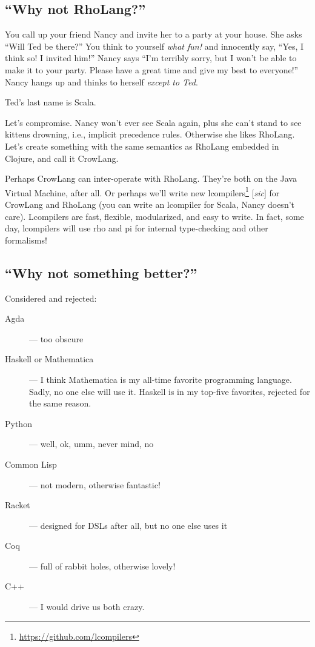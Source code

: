 \documentclass[10pt,oneside,x11names]{article}
\theoremstyle{definition}
\theoremstyle{warning}
\begin{document}
\subsection{``Why not RhoLang?''}
\label{sec:orgf0543f7}

You call up your friend Nancy and invite her to a party at your
house. She asks ``Will Ted be there?'' You think to yourself
\emph{what fun!} and innocently say, ``Yes, I think so! I invited him!''
Nancy says ``I'm terribly sorry, but I won't be able to make it to
your party. Please have a great time and give my best to
everyone!'' Nancy hangs up and thinks to herself \emph{except to Ted}.

Ted's last name is Scala.

Let's compromise. Nancy won't ever see Scala again, plus she can't
stand to see kittens drowning, i.e., implicit precedence rules.
Otherwise she likes RhoLang. Let's create something with the same
semantics as RhoLang embedded in Clojure, and call it CrowLang.

Perhaps CrowLang can inter-operate with RhoLang. They're both on
the Java Virtual Machine, after all. Or perhaps we'll write new
lcompilers\footnote{\url{https://github.com/lcompilers}\label{org116a054}} [\textit{sic}]
for CrowLang and RhoLang (you can write an lcompiler for Scala, Nancy
doesn't care). Lcompilers are fast, flexible, modularized, and
easy to write. In fact, some day, lcompilers will use rho and pi
for internal type-checking and other formalisms!

\subsection{``Why not something better?''}
\label{sec:org1223499}

Considered and rejected:

\begin{description}
\item[{Agda}] --- too obscure

\item[{Haskell or Mathematica}] --- I think Mathematica is my all-time
favorite programming language. Sadly, no one else will use it.
Haskell is in my top-five favorites, rejected for the same reason.

\item[{Python}] --- well, ok, umm, never mind, no

\item[{Common Lisp}] --- not modern, otherwise fantastic!

\item[{Racket}] --- designed for DSLs after all, but no one else uses it

\item[{Coq}] --- full of rabbit holes, otherwise lovely!

\item[{C++}] --- I would drive us both crazy.
\end{description}
\end{document}
